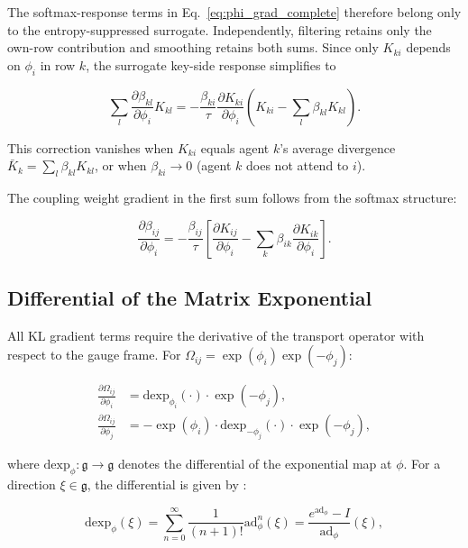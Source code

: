 \documentclass[twoside,11pt]{article}
\begin{document}
The softmax-response terms in Eq.~\eqref{eq:phi_grad_complete} therefore belong only to the entropy-suppressed surrogate. Independently, filtering retains only the own-row contribution and smoothing retains both sums. Since only $K_{ki}$ depends on $\phi_i$ in row $k$, the surrogate key-side response simplifies to

\begin{equation}
\sum_l \frac{\partial \beta_{kl}}{\partial \phi_i} K_{kl}
= -\frac{\beta_{ki}}{\tau}\frac{\partial K_{ki}}{\partial \phi_i}
\left(K_{ki} - \sum_l \beta_{kl} K_{kl}\right).
\label{eq:reverse_beta_grad_phi}
\end{equation}

This correction vanishes when $K_{ki}$ equals agent $k$'s average divergence $\bar{K}_k = \sum_l \beta_{kl} K_{kl}$, or when $\beta_{ki} \to 0$ (agent $k$ does not attend to $i$).

The coupling weight gradient in the first sum follows from the softmax structure:

\begin{equation}
\frac{\partial \beta_{ij}}{\partial \phi_i} = -\frac{\beta_{ij}}{\tau}\left[
\frac{\partial K_{ij}}{\partial \phi_i} - \sum_k \beta_{ik} \frac{\partial K_{ik}}{\partial \phi_i}
\right].
\label{eq:beta_grad_phi}
\end{equation}

\subsection{Differential of the Matrix Exponential}

All KL gradient terms require the derivative of the transport operator with respect to the gauge frame. For $\Omega_{ij} = \exp(\phi_i)\exp(-\phi_j)$:

\begin{align}
\frac{\partial \Omega_{ij}}{\partial \phi_i} &= \mathrm{dexp}_{\phi_i}(\cdot) \cdot \exp(-\phi_j), \label{eq:dOmega_dphi_i} \\
\frac{\partial \Omega_{ij}}{\partial \phi_j} &= -\exp(\phi_i) \cdot \mathrm{dexp}_{-\phi_j}(\cdot) \cdot \exp(-\phi_j), \label{eq:dOmega_dphi_j}
\end{align}

where $\mathrm{dexp}_\phi: \mathfrak{g} \to \mathfrak{g}$ denotes the differential of the exponential map at $\phi$. For a direction $\xi \in \mathfrak{g}$, the differential is given by \citep{Gallier2020,Hall2015}:

\begin{equation}
\mathrm{dexp}_\phi(\xi) = \sum_{n=0}^{\infty} \frac{1}{(n+1)!} \mathrm{ad}_\phi^n(\xi) = \frac{e^{\mathrm{ad}_\phi} - I}{\mathrm{ad}_\phi}(\xi),
\label{eq:dexp_series}
\end{equation}
\end{document}

